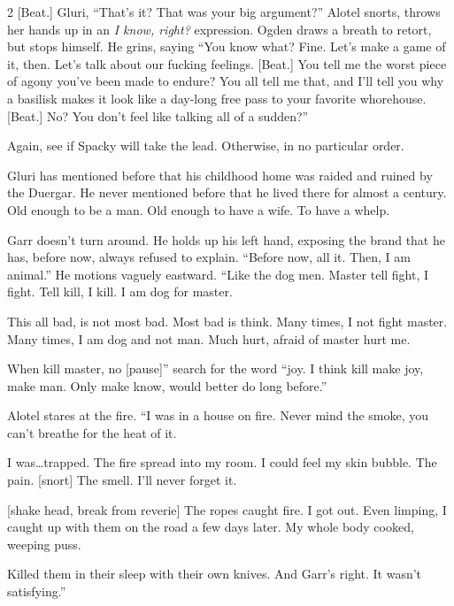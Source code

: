 \begin{multicols}{2}
  [Beat.]  Gluri, ``That's it?  That was your big argument?''
  Alotel snorts, throws her hands up in an \emph{I know, right?} expression.
  Ogden draws a breath to retort, but stops himself.
  He grins, saying
  ``You know what?
    Fine.
    Let's make a game of it, then.
    Let's talk about our fucking feelings.
    [Beat.]
    You tell me the worst piece of agony you've been made to endure?
    You all tell me that, and I'll tell you why a basilisk makes it look like a day-long free pass
      to your favorite whorehouse.
    [Beat.]
    No?
    You don't feel like talking all of a sudden?''


  Again, see if Spacky will take the lead.
  Otherwise, in no particular order.

  \hline

  Gluri has mentioned before that his childhood home was raided and ruined by the Duergar.
  He never mentioned before that he lived there for almost a century.
  Old enough to be a man.
  Old enough to have a wife.
  To have a whelp.

  \hline

Garr doesn't turn around.
  He holds up his left hand, exposing the brand that he has, before now, always refused to explain.
  ``Before now, all it.
    Then, I am animal.''
    He motions vaguely eastward.
  ``Like the dog men.
    Master tell fight, I fight.
    Tell kill, I kill.
    I am dog for master.

    This all bad, is not most bad.
    Most bad is think.
    Many times, I not fight master.
    Many times, I am dog and not man.
    Much hurt, afraid of master hurt me.

    When kill master, no [pause]'' search for the word ``joy.
    I think kill make joy, make man.
    Only make know, would better do long before.''

  \hline

  Alotel stares at the fire.
  ``I was in a house on fire.
    Never mind the smoke, you can't breathe for the heat of it.

    I was\dots trapped.
    The fire spread into my room.
    I could feel my skin bubble.
    The pain.
    [snort]
    The smell.
    I'll never forget it.

    [shake head, break from reverie]
    The ropes caught fire.
    I got out.
    Even limping, I caught up with them on the road a few days later.
    My whole body cooked, weeping puss.

    Killed them in their sleep with their own knives.
    And Garr's right.
    It wasn't satisfying.''


\end{multicols}
